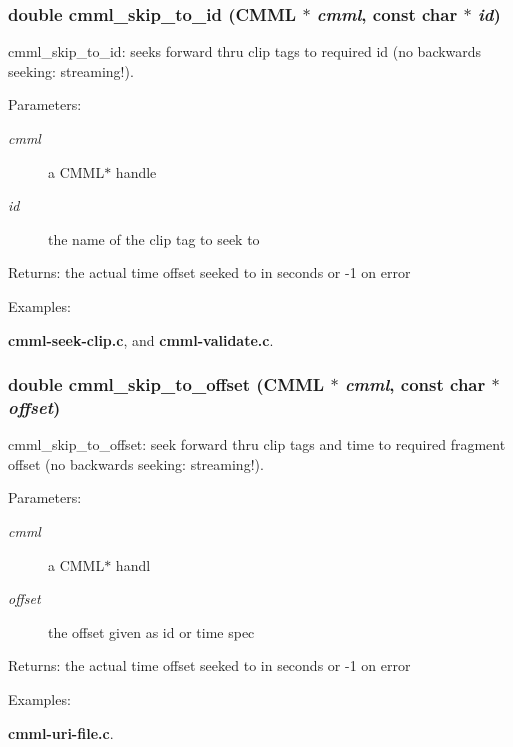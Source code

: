 \subsubsection{\setlength{\rightskip}{0pt plus 5cm}double cmml\_\-skip\_\-to\_\-id ({\bf CMML} $\ast$ {\em cmml}, const char $\ast$ {\em id})}\label{cmml_8h_a54}


cmml\_\-skip\_\-to\_\-id: seeks forward thru clip tags to required id (no backwards seeking: streaming!).

\begin{Desc}
\item[Parameters:]
\begin{description}
\item[{\em cmml}]a CMML$\ast$ handle \item[{\em id}]the name of the clip tag to seek to\end{description}
\end{Desc}
\begin{Desc}
\item[Returns:]the actual time offset seeked to in seconds or -1 on error \end{Desc}
\begin{Desc}
\item[Examples: ]\par
{\bf cmml-seek-clip.c}, and {\bf cmml-validate.c}.\end{Desc}
\subsubsection{\setlength{\rightskip}{0pt plus 5cm}double cmml\_\-skip\_\-to\_\-offset ({\bf CMML} $\ast$ {\em cmml}, const char $\ast$ {\em offset})}\label{cmml_8h_a55}


cmml\_\-skip\_\-to\_\-offset: seek forward thru clip tags and time to required fragment offset (no backwards seeking: streaming!).

\begin{Desc}
\item[Parameters:]
\begin{description}
\item[{\em cmml}]a CMML$\ast$ handl \item[{\em offset}]the offset given as id or time spec\end{description}
\end{Desc}
\begin{Desc}
\item[Returns:]the actual time offset seeked to in seconds or -1 on error \end{Desc}
\begin{Desc}
\item[Examples: ]\par
{\bf cmml-uri-file.c}.\end{Desc}

